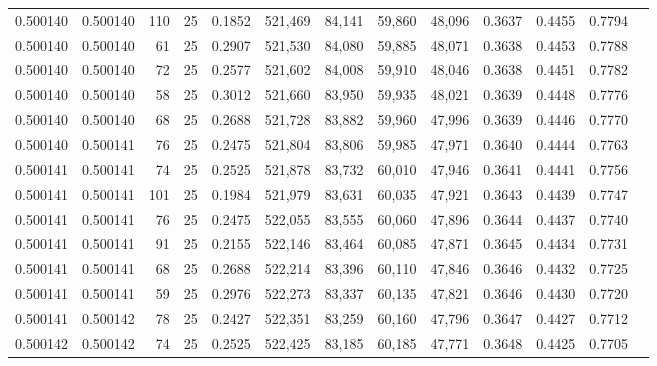 \begin{tabular}{rrrrrrrrrrrrr}
0.500140 & 0.500140 &   110 &  25 &                                     0.1852 & 521,469 &  84,141 &  59,860 &  48,096 & 0.3637 & 0.4455 & 0.7794 \\
0.500140 & 0.500140 &    61 &  25 &                                     0.2907 & 521,530 &  84,080 &  59,885 &  48,071 & 0.3638 & 0.4453 & 0.7788 \\
0.500140 & 0.500140 &    72 &  25 &                                     0.2577 & 521,602 &  84,008 &  59,910 &  48,046 & 0.3638 & 0.4451 & 0.7782 \\
0.500140 & 0.500140 &    58 &  25 &                                     0.3012 & 521,660 &  83,950 &  59,935 &  48,021 & 0.3639 & 0.4448 & 0.7776 \\
0.500140 & 0.500140 &    68 &  25 &                                     0.2688 & 521,728 &  83,882 &  59,960 &  47,996 & 0.3639 & 0.4446 & 0.7770 \\
0.500140 & 0.500141 &    76 &  25 &                                     0.2475 & 521,804 &  83,806 &  59,985 &  47,971 & 0.3640 & 0.4444 & 0.7763 \\
0.500141 & 0.500141 &    74 &  25 &                                     0.2525 & 521,878 &  83,732 &  60,010 &  47,946 & 0.3641 & 0.4441 & 0.7756 \\
0.500141 & 0.500141 &   101 &  25 &                                     0.1984 & 521,979 &  83,631 &  60,035 &  47,921 & 0.3643 & 0.4439 & 0.7747 \\
0.500141 & 0.500141 &    76 &  25 &                                     0.2475 & 522,055 &  83,555 &  60,060 &  47,896 & 0.3644 & 0.4437 & 0.7740 \\
0.500141 & 0.500141 &    91 &  25 &                                     0.2155 & 522,146 &  83,464 &  60,085 &  47,871 & 0.3645 & 0.4434 & 0.7731 \\
0.500141 & 0.500141 &    68 &  25 &                                     0.2688 & 522,214 &  83,396 &  60,110 &  47,846 & 0.3646 & 0.4432 & 0.7725 \\
0.500141 & 0.500141 &    59 &  25 &                                     0.2976 & 522,273 &  83,337 &  60,135 &  47,821 & 0.3646 & 0.4430 & 0.7720 \\
0.500141 & 0.500142 &    78 &  25 &                                     0.2427 & 522,351 &  83,259 &  60,160 &  47,796 & 0.3647 & 0.4427 & 0.7712 \\
0.500142 & 0.500142 &    74 &  25 &                                     0.2525 & 522,425 &  83,185 &  60,185 &  47,771 & 0.3648 & 0.4425 & 0.7705 \\

\end{tabular}
